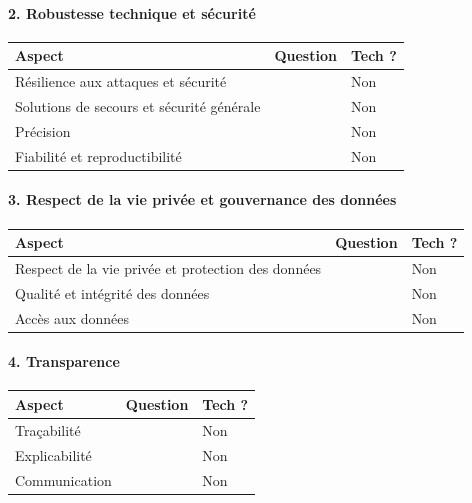 \documentclass[10pt, french, a4paper]{report}
\begin{document}
\paragraph{2. Robustesse technique et sécurité}

\begin{center}
  \begin{tabular}{ |p{4cm}|p{6cm}|p{2cm}| } 
    \hline
    Aspect & Question & Tech ? \\
    \hline
    \hline
    Résilience aux attaques et sécurité &  & Non \\
    \hline
    Solutions de secours et sécurité générale &  & Non \\
    \hline
    Précision &  & Non \\
    \hline
    Fiabilité et reproductibilité &  & Non \\
    \hline
    
  \end{tabular}
\end{center}

\paragraph{3. Respect de la vie privée et gouvernance des données}

\begin{center}
  \begin{tabular}{ |p{4cm}|p{6cm}|p{2cm}| } 
    \hline
    Aspect & Question & Tech ? \\
    \hline
    \hline
    Respect de la vie privée et protection des données &  & Non \\
    \hline
    Qualité et intégrité des données &  & Non \\
    \hline
    Accès aux données &  & Non \\
    \hline
    
  \end{tabular}
\end{center}

\paragraph{4. Transparence}

\begin{center}
  \begin{tabular}{ |p{4cm}|p{6cm}|p{2cm}| } 
    \hline
    Aspect & Question & Tech ? \\
    \hline
    \hline
    Traçabilité &  & Non \\
    \hline
    Explicabilité &  & Non \\
    \hline
    Communication &  & Non \\
    \hline
    
  \end{tabular}
\end{center}
\end{document}
